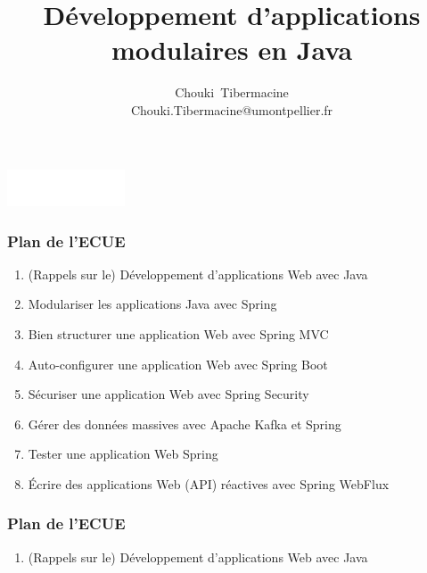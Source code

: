 \documentclass{beamer}
\title[]{\Large{Développement d'applications modulaires en Java}}
\author[C. Tibermacine]{\large{Chouki~Tibermacine}\\
\small{Chouki.Tibermacine@umontpellier.fr}}
\date{}
\begin{document}
\begin{frame}
\titlepage
\begin{flushright}
\includegraphics[width=3.5cm]{figs/polytech.png}
\end{flushright}
\end{frame}

\begin{frame}
  \frametitle{Plan de l'ECUE}
\begin{enumerate}
\item (Rappels sur le) Développement d'applications Web avec Java
\item Modulariser les applications Java avec Spring
\item Bien structurer une application Web avec Spring MVC
\item Auto-configurer une application Web avec Spring Boot
\item Sécuriser une application Web avec Spring Security
\item Gérer des données massives avec Apache Kafka et Spring
\item Tester une application Web Spring
\item Écrire des applications Web (API) réactives avec Spring WebFlux
\end{enumerate}
\end{frame}


\begin{frame}
  \frametitle{Plan de l'ECUE}
\begin{enumerate}
\item (Rappels sur le) Développement d'applications Web avec Java
  {\color{gray}{
	\item Modulariser les applications Java avec Spring
  	\item Bien structurer une application Web avec Spring MVC
  	\item Auto-configurer une application Web avec Spring Boot
  	\item Sécuriser une application Web avec Spring Security
  	\item Gérer des données massives avec Apache Kafka et Spring		
  	\item Tester une application Web Spring
  	\item Écrire des applications Web (API) réactives avec Spring WebFlux}}
  \end{enumerate}
\end{frame}
\end{document}
